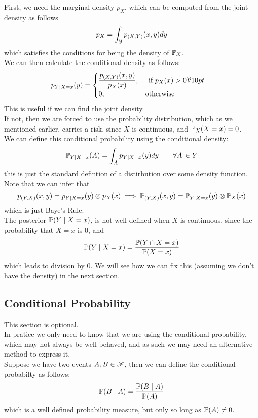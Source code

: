 \documentclass[12pt]{article}
\begin{document}
First, we need the marginal density $p_X$,
which can be computed from the joint
density as follows
\[ p_X = \int_{\mathcal{Y}} p_{(X, Y)}(x, y)dy \]
which satisfies the conditions
for being the density of $\mathbb{P}_X$. \\

We can then calculate the conditional
density as follows:
\[ p_{Y \mid X = x}(y)
= \begin{cases} 
    \dfrac{p_{(X, Y)}(x, y)}{p_X(x)},
    \quad \text { if } p_X(x) > 0
    \mathcal{V}{10pt}
     \\ 
        0, \qquad \qquad
        \quad \,\, \text{ otherwise }
     \end{cases}
\]
This is useful if we can find the
joint density. \\
If not, then we are forced 
to use the probability distribution,
which as we mentioned earlier,
carries a risk,
since $X$ is continuous,
and $\mathbb{P}_X(X = x) = 0$. \\

We can define this conditional
probability using the conditional
density:
\[ \mathbb{P}_{Y \mid X = x}(A)
= \int_{A} p_{Y \mid X = x}(y)dy
\qquad \forall A \, \in Y \]
this is just the standard defintion
of a distirbution over some density function. \\

Note that we can infer that
\[ p_{(Y, X)}(x, y) = p_{Y \mid X = x}(y)
\otimes p_{X}(x)  
\implies \mathbb{P}_{(Y, X)}(x, y)
= \mathbb{P}_{Y \mid X = x}(y) \otimes \mathbb{P}_{X}(x) \]
which is just Baye's Rule. \\

The posterior $\mathbb{P}(Y \mid X = x)$,
is not well defined when $X$ is continuous,
since the probability that $X = x$
is $0$,
and 
\[ \mathbb{P}(Y \mid X = x) = 
\dfrac{\mathbb{P}(Y \cap X = x)}
{\mathbb{P}(X = x)}  \]
which leads to division by $0$.
We will see how we can fix this
(assuming we don't have the density)
in the next section. \\

\newpage

\subsection*{Conditional Probability}

This section is optional. \\
In pratice we only need to know
that we are using the conditional
probability, which may not always be
well behaved, 
and as such we may need an alternative
method to express it. \\

Suppose we have two events 
$A, B \in \mathscr{F}$,
then we can define the conditional
probabilty as follows:
\[ \mathbb{P}(B \mid A)
= \dfrac{\mathbb{P}(B \mid A)}{\mathbb{P}(A)} \]
which is a well defined probability measure,
but only so long as $\mathbb{P}(A) \neq 0$. \\
\end{document}
